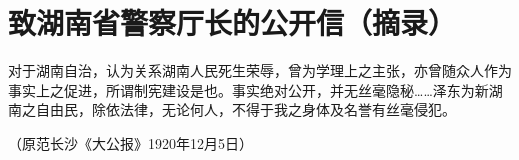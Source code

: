 \section{致湖南省警察厅长的公开信（摘录）}



对于湖南自治，认为关系湖南人民死生荣辱，曾为学理上之主张，亦曾随众人作为事实上之促进，所谓制宪建设是也。事实绝对公开，并无丝毫隐秘……泽东为新湖南之自由民，除依法律，无论何人，不得于我之身体及名誉有丝毫侵犯。

\begin{flushright}（原范长沙《大公报》1920年12月5日）\end{flushright}
